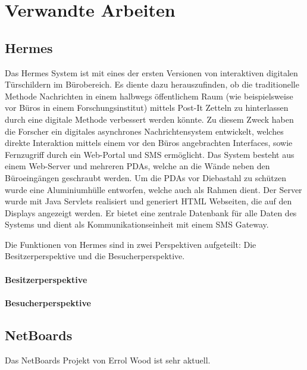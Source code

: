\chapter{Verwandte Arbeiten}
\section{Hermes}
Das Hermes System\cite{cheverest:2003:paper} ist mit eines der ersten Versionen von interaktiven digitalen Türschildern im Bürobereich.
Es diente dazu herauszufinden, ob die traditionelle Methode Nachrichten in einem halbwegs öffentlichem Raum (wie beispielsweise vor Büros in einem Forschungsinstitut) mittels Post-It Zetteln zu hinterlassen durch eine digitale Methode verbessert werden könnte.
Zu diesem Zweck haben die Forscher ein digitales asynchrones Nachrichtensystem entwickelt, welches direkte Interaktion mittels einem vor den Büros angebrachten Interfaces, sowie Fernzugriff durch ein Web-Portal und SMS ermöglicht.
Das System besteht aus einem Web-Server und mehreren PDAs, welche an die Wände neben den Büroeingängen geschraubt werden.
Um die PDAs vor Diebastahl zu schützen wurde eine Aluminiumhülle entworfen, welche auch als Rahmen dient.
Der Server wurde mit Java Servlets realisiert und generiert HTML Webseiten, die auf den Displays angezeigt werden. Er bietet eine zentrale Datenbank für alle Daten des Systems und dient als Kommunikationseinheit mit einem SMS Gateway.

Die Funktionen von Hermes sind in zwei Perspektiven aufgeteilt: Die Besitzerperspektive und die Besucherperspektive.
\subsubsection{Besitzerperspektive}
\subsubsection{Besucherperspektive}







\section{NetBoards}
Das NetBoards Projekt von Errol Wood\cite{wood:2014} ist sehr aktuell. 


